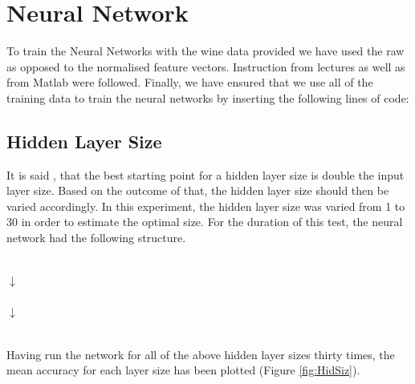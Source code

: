 \documentclass[10pt,twocolumn,letterpaper]{article}
\begin{document}
\section{Neural Network}

To train the Neural Networks with the wine data provided we have used the raw as opposed to the normalised feature vectors. Instruction from lectures as well as from Matlab \cite{MatlabWine} were followed.  Finally, we have ensured that we use all of the training data to train the neural networks by inserting the following lines of code:

\begin{center}
\end{center}


\subsection{Hidden Layer Size}
It is said \cite{NN_Java}, that the best starting point for a hidden layer size is double the input layer size. Based on the outcome of that, the hidden layer size should then be varied accordingly. In this experiment, the hidden layer size was varied from 1 to 30 in order to estimate the optimal size. For the duration of this test, the neural network had the following structure.

\begin{center}
 \\

\centering
$\downarrow$ \\

\centering
{}\\

\centering
$\downarrow$\\

\centering
{}\\

\end{center}

Having run the network for all of the above hidden layer sizes thirty times, the mean accuracy for each layer size has been plotted (Figure \ref{fig:HidSiz}).
\end{document}
